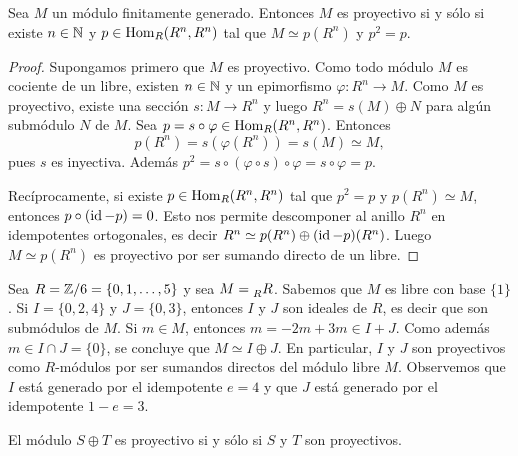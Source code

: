 \begin{proposition}
Sea $M$ un módulo finitamente generado. Entonces $M$ es proyectivo si y sólo si existe $n\in\mathbb{N}$ y $p\in\operatorname{Hom}_R(R^n,R^n)$ tal que
$M\simeq p(R^n)$ y $p^2=p$. 	
\end{proposition}

\begin{proof}
	Supongamos primero que $M$ es proyectivo. Como todo módulo $M$ es cociente de un libre, 
	existen $n\in\mathbb{N}$ y un epimorfismo $\varphi\colon R^n\to M$. Como $M$ es proyectivo, existe una sección 
	$s\colon M\to R^n$ y luego $R^n=s(M)\oplus N$ para algún submódulo $N$ de $M$. Sea $p=s\circ\varphi\in\operatorname{Hom}_R(R^n,R^n)$. Entonces
	\[
	p(R^n)=s(\varphi(R^n))=s(M)\simeq M,
	\]
	pues $s$ es inyectiva. Además $p^2=s\circ(\varphi\circ s)\circ\varphi=s\circ\varphi=p$.   
	
	Recíprocamente, si existe $p\in\operatorname{Hom}_R(R^n,R^n)$ tal que $p^2=p$ y $p(R^n)\simeq M$, entonces $p\circ (\operatorname{id}-p)=0$. Esto nos
	permite descomponer al anillo $R^n$ en idempotentes ortogonales, es decir
	$R^n\simeq p(R^n)\oplus (\operatorname{id}-p)(R^n)$. Luego $M\simeq p(R^n)$ es proyectivo por ser sumando directo de un libre.  
\end{proof}

\begin{example}
Sea $R=\mathbb{Z}/6=\{0,1,\dots,5\}$ y sea $M=\prescript{}{R}R$. Sabemos que $M$ es libre con base $\{1\}$. Si $I=\{0,2,4\}$ y $J=\{0,3\}$, entonces
$I$ y $J$ son ideales de $R$, es decir que son submódulos de $M$. Si $m\in M$, entonces
$m=-2m+3m\in I+J$. Como además $m\in I\cap J=\{0\}$, se concluye que $M\simeq I\oplus J$. En particular, $I$ y $J$ son proyectivos
como $R$-módulos por ser sumandos directos del módulo libre $M$. Observemos que $I$ está generado por el idempotente
$e=4$ y que $J$ está generado por el idempotente $1-e=3$.
\end{example}


\begin{proposition}
El módulo $S\oplus T$ es proyectivo si y sólo si $S$ y $T$ son proyectivos. 	
\end{proposition}

